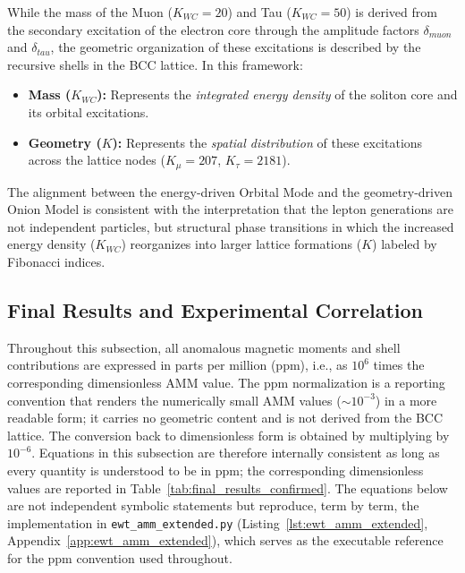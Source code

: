 \documentclass[10pt,a4paper]{article}
\begin{document}
While the mass of the Muon ($K_{WC}=20$) and Tau ($K_{WC}=50$) is derived from the secondary excitation of the electron core through the amplitude factors $\delta_{muon}$ and $\delta_{tau}$, the geometric organization of these excitations is described by the recursive shells in the BCC lattice. In this framework:
\begin{itemize}
	\item \textbf{Mass ($K_{WC}$):} Represents the \textit{integrated energy density} of the soliton core and its orbital excitations.
	\item \textbf{Geometry ($K$):} Represents the \textit{spatial distribution} of these excitations across the lattice nodes ($K_\mu=207$, $K_\tau=2181$).
\end{itemize}
The alignment between the energy-driven Orbital Mode and the geometry-driven Onion Model is consistent with the interpretation that the lepton generations are not independent particles, but structural phase transitions in which the increased energy density ($K_{WC}$) reorganizes into larger lattice formations ($K$) labeled by Fibonacci indices.

\vspace{1em}
\noindent
\begin{center}
\end{center}

\subsection{Final Results and Experimental Correlation}
\label{sec:final_experimental_proof}
Throughout this subsection, all anomalous magnetic moments and shell
contributions are expressed in parts per million (ppm), i.e., as
$10^6$ times the corresponding dimensionless AMM value. The ppm
normalization is a reporting convention that renders the numerically
small AMM values ($\sim 10^{-3}$) in a more readable form; it carries
no geometric content and is not derived from the BCC lattice. The
conversion back to dimensionless form is obtained by multiplying
by $10^{-6}$. Equations in this subsection are therefore internally
consistent as long as every quantity is understood to be in ppm; the
corresponding dimensionless values are reported in
Table~\ref{tab:final_results_confirmed}. The equations below are not
independent symbolic statements but reproduce, term by term, the
implementation in \texttt{ewt\_amm\_extended.py} (Listing~\ref{lst:ewt_amm_extended},
Appendix~\ref{app:ewt_amm_extended}), which serves as the executable
reference for the ppm convention used throughout.
\end{document}
